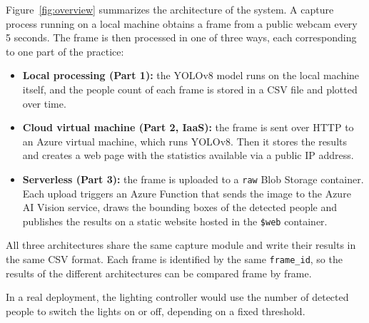 \documentclass{article}
\begin{document}
    Figure~\ref{fig:overview} summarizes the architecture of the system. A capture process running on a local machine obtains a frame from a public webcam every 5 seconds. The frame is then processed in one of three ways, each corresponding to one part of the practice:

    \begin{itemize}
        \item \textbf{Local processing (Part 1):} the YOLOv8 model runs on the local machine itself, and the people count of each frame is stored in a CSV file and plotted over time.
        \item \textbf{Cloud virtual machine (Part 2, IaaS):} the frame is sent over HTTP to an Azure virtual machine, which runs YOLOv8. Then it stores the results and creates a web page with the statistics available via a public IP address.
        \item \textbf{Serverless (Part 3):} the frame is uploaded to a \texttt{raw} Blob Storage container. Each upload triggers an Azure Function that sends the image to the Azure AI Vision service, draws the bounding boxes of the detected people and publishes the results on a static website hosted in the \texttt{\$web} container.
    \end{itemize}

    All three architectures share the same capture module and write their results in the same CSV format. Each frame is identified by the same \texttt{frame\_id}, so the results of the different architectures can be compared frame by frame.

    In a real deployment, the lighting controller would use the number of detected people to switch the lights on or off, depending on a fixed threshold.
\end{document}

